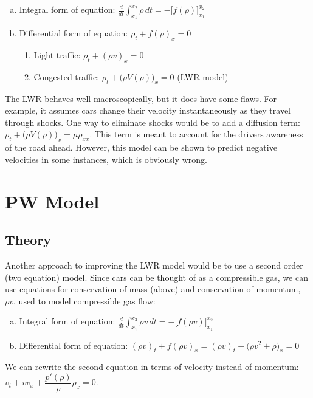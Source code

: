 \documentclass{article}
\begin{document}
\begin{enumerate}[(a)]
\item Integral form of equation: $\displaystyle \frac{d}{dt} \int_{x_1}^{x_2} \rho \, dt = -\Big[ f( \rho ) \Big]_{x_1}^{x_2}$
\item Differential form of equation: $\rho_t + f( \rho )_x = 0$
\begin{enumerate}[i]
\item Light traffic: $\rho_t + (\rho v)_x = 0$
\item Congested traffic: $\rho_t + \Big( \rho V(\rho) \Big)_x = 0$ (LWR model)
\end{enumerate}
\end{enumerate}

The LWR behaves well macroscopically, but it does have some flaws.  For example, it assumes cars change their velocity instantaneously as they travel through shocks.  One way to eliminate shocks would be to add a diffusion term: $\rho_t + \Big( \rho V(\rho) \Big)_x = \mu \rho_{xx}$.  This term is meant to account for the drivers awareness of the road ahead.  However, this model can be shown to predict negative velocities in some instances, which is obviously wrong.

\section{PW Model}
\subsection{Theory}
Another approach to improving the LWR model would be to use a second order (two equation) model. Since cars can be thought of as a compressible gas, we can use equations for conservation of mass (above) and conservation of momentum, $\rho v$, used to model compressible gas flow:

\begin{enumerate}[(a)]
\item Integral form of equation: $\displaystyle \frac{d}{dt} \int_{x_1}^{x_2} \rho v \, dt = -\Big[ f( \rho v ) \Big]_{x_1}^{x_2}$
\item Differential form of equation: $(\rho v)_t + f( \rho v )_x = (\rho v)_t + \Big( \rho v^2 + \rho \Big)_x = 0$
\end{enumerate}

We can rewrite the second equation in terms of velocity instead of momentum: $v_t + v v_x + \dfrac{p'(\rho)}{\rho} \rho_x = 0$. \\
\end{document}
